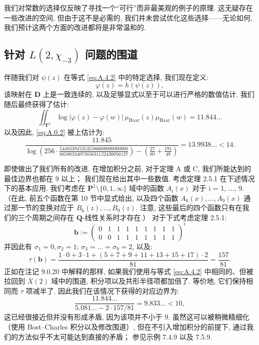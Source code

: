 \begin{remark}\label{rem:A.4.6}
我们对常数的选择仅反映了寻找一个“可行”而非最美观的例子的原理. 
这无疑存在一些改进的空间, 
但由于这不是必需的, 我们并未尝试优化这些选择——无论如何, 我们预计这两个方面的改进都将是非常温和的. \end{remark}

\subsection{针对 \texorpdfstring{$L(2, \chi_{-3})$}{L(2, \textbackslash{}chi\_\{-3\})} 问题的围道}\label{sec:A.5}

伴随我们对 \(\psi(z)\) 在等式 \eqref{eq:A.4.2} 中的特定选择, 我们现在定义:
\[ \varphi(z) = h(\psi(z)), \]
该映射在 \(\mathbf{D}\) 上是一致连续的, 
以及足够显式以至于可以进行严格的数值估计. 
我们随后最终获得了估计:
\[ \iint_{\mathbf{T}^2} \log |\varphi(z) - \varphi(w)| \, \mu_{\text{Haar}}(z) \mu_{\text{Haar}}(w) = 11.844\dots \]
以及因此, \eqref{eq:A.0.2} 被上估计为:
\begin{equation}\label{eq:A.5.1}
\frac{11.845}{\log\left(256 \cdot \frac{5448339453535586608000000000}{8658833407565631122430056127}\right) - \left(\frac{27}{80} + \frac{191}{49}\right)} = 13.9938 \dots < 14.
\end{equation}

\begin{remark}\label{rem:A.5.2}
即使做出了我们所有的改进, 在增加积分之前, 
对于定理 A 或 C, 我们所能达到的最佳边界也都在 9 以上； 
我们现在给出其中一些数值. 
考虑定理 2.5.1 在下述情况下的基本应用. 
我们考虑在 \(\mathbf{P}^1 \setminus \{0, 1, \infty\}\) 域中的函数 \(A_i(x)\) 对于 i = 1, ..., 9. 
（在此, 前五个函数在第 10 节中显式给出, 
以及四个函数 \(A_6(x), ..., A_9(x)\) 通过那一节的变换对应于 \(B_6(z), ..., B_9(z)\). 
注意, 这些最后的四个函数只有在我们的三个周期之间存在 \(\mathbf{Q}\)-线性关系时才存在.） 
对于下式考虑定理 2.5.1:
\[ \mathbf{b} := \begin{pmatrix} 0 & 1 & 1 & 1 & 1 & 1 & 1 & 1 & 1 \\ 0 & 0 & 1 & 1 & 1 & 1 & 1 & 1 & 1 \end{pmatrix}^{\mathrm{t}} \]
并因此有 \(\sigma_1 = 0, \sigma_2 = 1\); \(\sigma_3 = \dots = \sigma_9 = 2\), 
以及:
\[ \tau(\mathbf{b}) = \frac{1 \cdot 0 + 3 \cdot 1 + (5 + 7 + 9 + 11 + 13 + 15 + 17) \cdot 2}{81} = \frac{157}{81}. \]
正如在注记 9.0.20 中解释的那样, 
如果我们使用与等式 \eqref{eq:A.4.2} 中相同的、但被拉回到 \(X(2)\) 域中的围道, 
积分项以及共形半径项都加倍了. 
等价地, 它们保持相同而 \(\tau\) 项减半了. 
因此我们在该情况下获得的对应边界为:
\begin{equation}\label{eq:A.5.3}
\frac{11.844...}{5.081...-2\cdot 157/81} = 9.833... < 10,
\end{equation}
这已经很接近但并没有形成矛盾, 因为该项并不小于 9. 
虽然这可以被稍微精细化（使用 Bost--Charles 积分以及修改围道）, 
但在不引入增加积分的前提下, 通过我们的方法似乎不太可能达到直接的矛盾； 
参见示例 7.4.9 以及 7.5.9. \end{remark}

